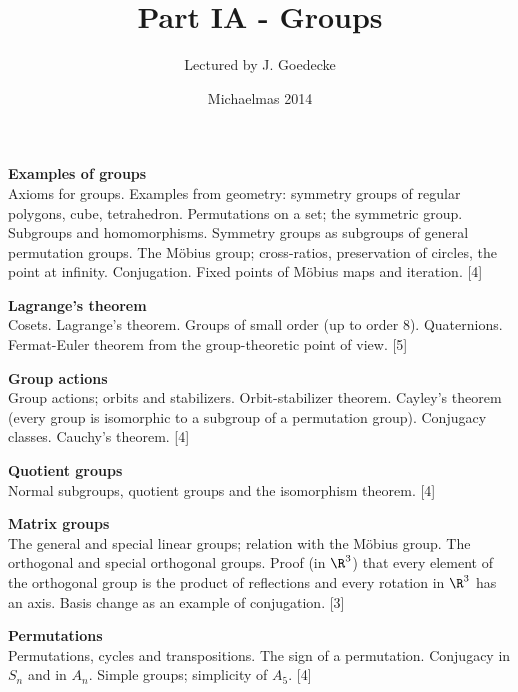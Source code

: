 \documentclass[a4paper]{article}
\title{Part IA - Groups}
\author{Lectured by J. Goedecke}
\date{Michaelmas 2014}
\begin{document}
\maketitle
{\small
  \noindent\textbf{Examples of groups}\\
  Axioms for groups. Examples from geometry: symmetry groups of regular polygons, cube, tetrahedron. Permutations on a set; the symmetric group. Subgroups and homomorphisms. Symmetry groups as subgroups of general permutation groups. The M\"obius group; cross-ratios, preservation of circles, the point at infinity. Conjugation. Fixed points of M\"obius maps and iteration.\hspace*{\fill} [4]

  \vspace{10pt}
  \noindent\textbf{Lagrange’s theorem}\\
  Cosets. Lagrange’s theorem. Groups of small order (up to order 8). Quaternions. Fermat-Euler theorem from the group-theoretic point of view.\hspace*{\fill} [5]

  \vspace{10pt}
  \noindent\textbf{Group actions}\\
  Group actions; orbits and stabilizers. Orbit-stabilizer theorem. Cayley's theorem (every group is isomorphic to a subgroup of a permutation group). Conjugacy classes. Cauchy's theorem.\hspace*{\fill} [4]

  \vspace{10pt}
  \noindent\textbf{Quotient groups}\\
  Normal subgroups, quotient groups and the isomorphism theorem.\hspace*{\fill} [4]

  \vspace{10pt}
  \noindent
  \textbf{Matrix groups}\\
  The general and special linear groups; relation with the M\"obius group. The orthogonal and special orthogonal groups. Proof (in $\R^3$) that every element of the orthogonal group is the product of reflections and every rotation in $\R^3$ has an axis. Basis change as an example of conjugation.\hspace*{\fill} [3]

  \vspace{10pt}
  \noindent\textbf{Permutations}\\
  Permutations, cycles and transpositions. The sign of a permutation. Conjugacy in $S_n$ and in $A_n$. Simple groups; simplicity of $A_5$.\hspace*{\fill} [4]}
  \tableofcontents
  \newpage
\end{document}
